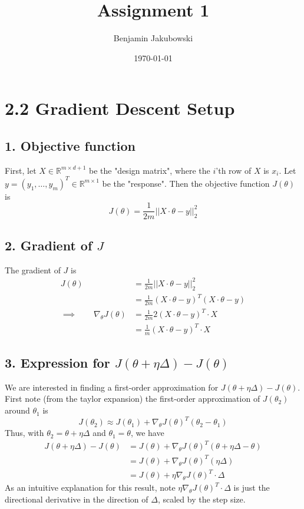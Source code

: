 \documentclass[paper=a4, fontsize=11pt]{scrartcl} %
\title{	Assignment 1}
\author{Benjamin Jakubowski} %
\date{\normalsize\today} %
\numberwithin{equation}{section} %
\numberwithin{figure}{section} %
\numberwithin{table}{section} %
\begin{document}
\maketitle %


\section*{2.2 Gradient Descent Setup}

\subsection*{1. Objective function}

First, let $X \in \mathbb{R}^{m \times d + 1}$ be the "design matrix", where the $i$'th row of $X$ is $x_i$. Let $y = (y_1, \dots, y_m)^T \in \mathbb{R}^{m \times 1}$ be the "response". Then the objective function $J(\theta)$ is
\[J(\theta) = \frac{1}{2m} ||X\cdot \theta - y ||_2 ^2\]

\subsection*{2. Gradient of $J$}

The gradient of $J$ is
\begin{align*}
J(\theta) &= \frac{1}{2m} ||X\cdot \theta - y ||_2 ^2 \\
   &= \frac{1}{2m} (X\cdot \theta - y)^T (X\cdot \theta - y) \\
\implies \qquad{} \nabla_{\theta} J(\theta) &= \frac{1}{2m} 2(X\cdot \theta - y)^T \cdot X \\
    &= \frac{1}{m} (X\cdot \theta - y)^T \cdot X
\end{align*}
   
\subsection*{3. Expression for $J(\theta + \eta \Delta) - J(\theta)$}
We are interested in finding a first-order approximation for  $J(\theta + \eta \Delta) - J(\theta)$. First note (from the taylor expansion) the first-order approximation of $J(\theta_2)$ around $\theta_1$ is
\[J(\theta_2) \approx J(\theta_1) + \nabla_{\theta} J(\theta) ^T (\theta_2 - \theta_1)\]
Thus, with $\theta_2 = \theta + \eta \Delta$ and $\theta_1 = \theta$, we have
\begin{align*}
J(\theta + \eta \Delta) - J(\theta) &= J(\theta) + \nabla_{\theta} J(\theta) ^T (\theta + \eta \Delta - \theta) \\
   &= J(\theta) + \nabla_{\theta} J(\theta) ^T (\eta \Delta) \\
   &= J(\theta) + \eta \nabla_{\theta} J(\theta) ^T \cdot \Delta
\end{align*}
As an intuitive explanation for this result, note $\eta \nabla_{\theta} J(\theta) ^T \cdot \Delta$ is just the directional derivative in the direction of $\Delta$, scaled by the step size.
   
\end{document}
